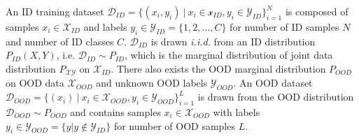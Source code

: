 An ID training dataset $\mathcal{D}_{ID} = \{(x_i, y_i)\ |\ x_i \in \mathcal{x}_{ID},y_i \in \mathcal{Y}_{ID}\}_{i=1}^N$ is composed of samples $x_i \in \mathcal{X}_{ID}$ and labels $y_i \in \mathcal{Y}_{ID} = \{1,2,\dots,C\}$ for number of ID samples $N$ and number of ID classes $C$. $\mathcal{D}_{ID}$ is drawn \emph{i.i.d.} from an ID distribution $P_{ID}(X, Y)$, i.e. $\mathcal{D}_{ID} \sim P_{ID}$, which is the marginal distribution of joint data distribution $P_{\mathcal{X} \mathcal{Y}}$ on $\mathcal{X}_{ID}$. There also exists the OOD marginal distribution $P_{OOD}$ on OOD data $\mathcal{X}_{OOD}$ and unknown OOD labels $\mathcal{Y}_{OOD}$. An OOD dataset $\mathcal{D}_{OOD} = \{(x_i)\ |\ x_i \in \mathcal{X}_{OOD},y_i \in \mathcal{Y}_{OOD}\}^{L}_{i=1}$ is drawn from the OOD distribution $\mathcal{D}_{OOD} \sim P_{OOD}$ and contains samples $x_i \in \mathcal{X}_{OOD}$ with labels $y_i \in \mathcal{Y}_{OOD} = \{y | y \notin \mathcal{Y}_{ID}\}$ for number of OOD samples $L$.

